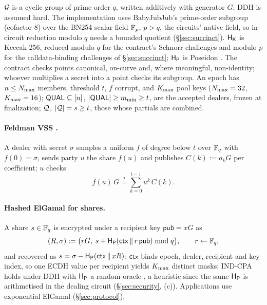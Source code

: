 $\mathcal{G}$ is a cyclic group of prime order $q$, written additively with generator $G$; DDH is assumed hard. The implementation uses BabyJubJub's prime-order subgroup (cofactor $8$) over the BN254 scalar field $\mathbb{F}_p$, $p > q$, the circuits' native field, so in-circuit reduction modulo $q$ needs a bounded quotient (\S\ref{sec:succinct}). $\mathsf{H}_{\mathsf{K}}$ is Keccak-256, reduced modulo $q$ for the contract's Schnorr challenges and modulo $p$ for the calldata-binding challenges of \S\ref{sec:succinct}; $\mathsf{H}_{\mathsf{P}}$ is Poseidon \cite{grassi2021poseidon}. The contract checks points canonical, on-curve and, where meaningful, non-identity; whoever multiplies a secret into a point checks its subgroup. An epoch has $n \le N_{\max}$ members, threshold $t$, $f$ corrupt, and $K_{\max}$ pool keys ($N_{\max} = 32$, $K_{\max} = 16$); $\mathsf{QUAL} \subseteq [n]$, $|\mathsf{QUAL}| \ge m_{\min} \ge t$, are the accepted dealers, frozen at finalization; $\mathcal{Q}$, $|\mathcal{Q}| = s \ge t$, those whose partials are combined.

\paragraph{Feldman VSS \cite{shamir1979share,feldman1987practical}.} A dealer with secret $\sigma$ samples a uniform $f$ of degree below $t$ over $\mathbb{F}_q$ with $f(0) = \sigma$, sends party $u$ the share $f(u)$ and publishes $C(k) := a_k G$ per coefficient; $u$ checks
\begin{equation}
    f(u)\,G \overset{?}{=} \sum_{k=0}^{t-1} u^k\, C(k).
    \label{eq:feldman}
\end{equation}

\paragraph{Hashed ElGamal for shares.} A share $s \in \mathbb{F}_q$ is encrypted under a recipient key $\mathsf{pub} = xG$ as
\begin{equation}
    (R, \sigma) := \bigl(rG,\; s + \mathsf{H}_{\mathsf{P}}(\mathsf{ctx} \,\|\, r\,\mathsf{pub}) \bmod q\bigr), \qquad r \leftarrow \mathbb{F}_q,
    \label{eq:hashed-elgamal}
\end{equation}
and recovered as $s = \sigma - \mathsf{H}_{\mathsf{P}}(\mathsf{ctx} \,\|\, xR)$; $\mathsf{ctx}$ binds epoch, dealer, recipient and key index, so one ECDH value per recipient yields $K_{\max}$ distinct masks; IND-CPA holds under DDH with $\mathsf{H}_{\mathsf{P}}$ a random oracle \cite{abdalla_bellare_rogaway_dhies_2001,cash_kiltz_shoup_twin_dh_2008}, a heuristic since the same $\mathsf{H}_{\mathsf{P}}$ is arithmetised in the dealing circuit (\S\ref{sec:security}, (c)). Applications use exponential ElGamal (\S\ref{sec:protocol}).

